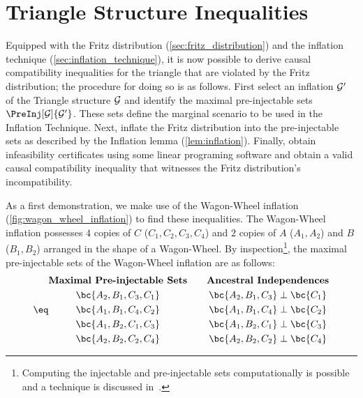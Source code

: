 \documentclass[aps, 10pt, english, twoside, pra, nofootinbib, tightenlines, longbibliography, superscriptaddress]{revtex4-1}
\begin{document}
    \section{Triangle Structure Inequalities}
    \label{sec:found_inequalities}

    Equipped with the Fritz distribution (\cref{sec:fritz_distribution}) and the inflation technique (\cref{sec:inflation_technique}), it is now possible to derive causal compatibility inequalities for the triangle that are violated by the Fritz distribution; the procedure for doing so is as follows. First select an inflation $\mathcal{G}'$ of the Triangle structure $\mathcal{G}$ and identify the maximal pre-injectable sets $\PreInj[\graph]{\graph'}$. These sets define the marginal scenario to be used in the Inflation Technique. Next, inflate the Fritz distribution into the pre-injectable sets as described by the Inflation lemma (\cref{lem:inflation}). Finally, obtain infeasibility certificates using some linear programing software and obtain a valid causal compatibility inequality that witnesses the Fritz distribution's incompatibility.

    As a first demonstration, we make use of the Wagon-Wheel inflation (\cref{fig:wagon_wheel_inflation}) to find these inequalities. The Wagon-Wheel inflation possesses $4$ copies of $C$ ($C_1, C_2, C_3, C_4$) and $2$ copies of $A$ ($A_1, A_2$) and $B$ ($B_1, B_2$) arranged in the shape of a Wagon-Wheel. By inspection\footnote{Computing the injectable and pre-injectable sets computationally is possible and a technique is discussed in~\citet{Inflation}.}, the maximal pre-injectable sets of the Wagon-Wheel inflation are as follows:
    \begin{equation*}
        \eq \label{eq:pre_injectable_triangle_structure_wagon_wheel}
        \begin{gathered}
            \textbf{Maximal Pre-injectable Sets} \\
            \bc{A_2, B_1, C_3, C_1} \\
            \bc{A_1, B_1, C_4, C_2} \\
            \bc{A_1, B_2, C_1, C_3} \\
            \bc{A_2, B_2, C_2, C_4} \\
        \end{gathered}
        \qquad
        \begin{gathered}
            \textbf{Ancestral Independences} \\
            \bc{A_2, B_1, C_3} \ancestralindep \bc{C_1} \\
            \bc{A_1, B_1, C_4} \ancestralindep \bc{C_2} \\
            \bc{A_1, B_2, C_1} \ancestralindep \bc{C_3} \\
            \bc{A_2, B_2, C_2} \ancestralindep \bc{C_4} \\
        \end{gathered}
    \end{equation*}
\end{document}
